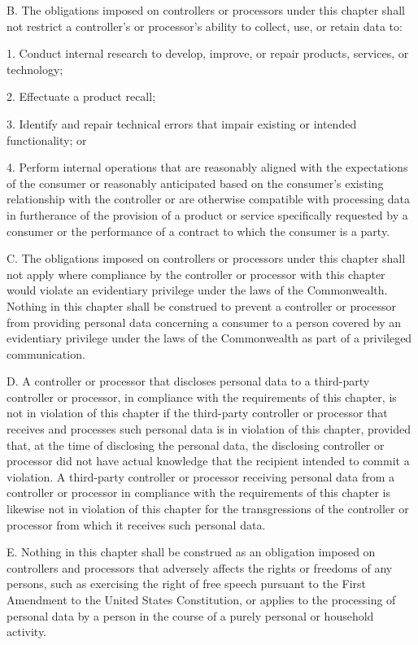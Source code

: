 B. The obligations imposed on controllers or processors under this chapter shall not restrict a controller's or processor's ability to collect, use, or retain data to:

1. Conduct internal research to develop, improve, or repair products, services, or technology;

2. Effectuate a product recall;

3. Identify and repair technical errors that impair existing or intended functionality; or

4. Perform internal operations that are reasonably aligned with the expectations of the consumer or reasonably anticipated based on the consumer's existing relationship with the controller or are otherwise compatible with processing data in furtherance of the provision of a product or service specifically requested by a consumer or the performance of a contract to which the consumer is a party.

C. The obligations imposed on controllers or processors under this chapter shall not apply where compliance by the controller or processor with this chapter would violate an evidentiary privilege under the laws of the Commonwealth. Nothing in this chapter shall be construed to prevent a controller or processor from providing personal data concerning a consumer to a person covered by an evidentiary privilege under the laws of the Commonwealth as part of a privileged communication.

D. A controller or processor that discloses personal data to a third-party controller or processor, in compliance with the requirements of this chapter, is not in violation of this chapter if the third-party controller or processor that receives and processes such personal data is in violation of this chapter, provided that, at the time of disclosing the personal data, the disclosing controller or processor did not have actual knowledge that the recipient intended to commit a violation. A third-party controller or processor receiving personal data from a controller or processor in compliance with the requirements of this chapter is likewise not in violation of this chapter for the transgressions of the controller or processor from which it receives such personal data.

E. Nothing in this chapter shall be construed as an obligation imposed on controllers and processors that adversely affects the rights or freedoms of any persons, such as exercising the right of free speech pursuant to the First Amendment to the United States Constitution, or applies to the processing of personal data by a person in the course of a purely personal or household activity.

